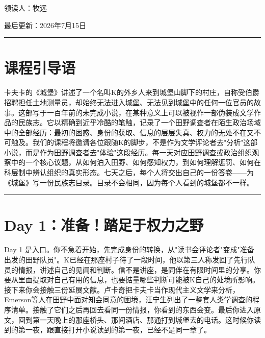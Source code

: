 \documentclass[11pt, a4paper]{ctexart}
\newcommand{\daysep}{\vspace{0.5em}\noindent\rule{\textwidth}{0.2pt}\vspace{0.8em}}
\begin{document}

\vspace{0.3em}

\vspace{0.8em}
\noindent 领读人：牧远

\noindent 最后更新：2026年7月15日

\vspace{1em}
\noindent\rule{\textwidth}{0.4pt}

\vspace{1em}

\section*{课程引导语}

卡夫卡的《城堡》讲述了一个名叫K的外乡人来到城堡山脚下的村庄，自称受伯爵招聘担任土地测量员，却始终无法进入城堡、无法见到城堡中的任何一位官员的故事。这部写于一百年前的未完成小说，在某种意义上可以被视作一部伪装成文学作品的民族志。它以精确到近乎冷酷的笔触，记录了一个田野调查者在陌生政治场域中的全部经历：最初的困惑、身份的获取、信息的层层失真、权力的无处不在又不可触及。我们的课程将邀请各位跟随K的脚步，不是作为文学评论者去"分析"这部小说，而是作为田野调查者去"体验"这段经历。每一天对应田野调查或政治组织观察中的一个核心议题，从如何泊入田野、如何感知权力，到如何理解惩罚、如何在科层制中辨认组织的真实形态。七天之后，每个人将交出自己的一份答卷——为《城堡》写一份民族志目录。目录不会相同，因为每个人看到的城堡都不一样。

\daysep

\section*{Day 1：准备！踏足于权力之野}

Day 1 是入口。你不急着开始，先完成身份的转换，从"读书会评论者"变成"准备出发的田野队员"。K已经在那座村子待了一段时间，他以第三人称发回了先行队员的情报，讲述自己的见闻和判断。信不是讲座，是同伴在有限时间里的分享。你要从里面提取对自己有用的信息，也要掂量哪些判断可能被K自己的处境所影响。接下来你会接触三份延展文献。卢卡奇把卡夫卡当作现代主义文学来分析，Emerson等人在田野中面对知会同意的困境，汪宁生列出了一整套人类学调查的程序清单。接触了它们之后再回去看同一份情报，你看到的东西会变。最后你进入原文，回到第一天晚上的那座桥头、那间酒店、那通打到城堡去的电话。这时候你读到的第一夜，跟直接打开小说读到的第一夜，已经不是同一章了。

\vspace{0.5em}
\end{document}
